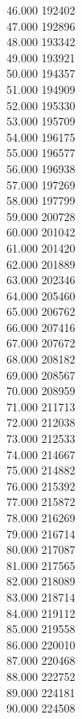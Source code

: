 { 46.000	192402 \\
 47.000	192896 \\
 48.000	193342 \\
 49.000	193921 \\
 50.000	194357 \\
 51.000	194909 \\
 52.000	195330 \\
 53.000	195709 \\
 54.000	196175 \\
 55.000	196577 \\
 56.000	196938 \\
 57.000	197269 \\
 58.000	197799 \\
 59.000	200728 \\
 60.000	201042 \\
 61.000	201420 \\
 62.000	201889 \\
 63.000	202346 \\
 64.000	205460 \\
 65.000	206762 \\
 66.000	207416 \\
 67.000	207672 \\
 68.000	208182 \\
 69.000	208567 \\
 70.000	208959 \\
 71.000	211713 \\
 72.000	212038 \\
 73.000	212533 \\
 74.000	214667 \\
 75.000	214882 \\
 76.000	215392 \\
 77.000	215872 \\
 78.000	216269 \\
 79.000	216714 \\
 80.000	217087 \\
 81.000	217565 \\
 82.000	218089 \\
 83.000	218714 \\
 84.000	219112 \\
 85.000	219558 \\
 86.000	220010 \\
 87.000	220468 \\
 88.000	222752 \\
 89.000	224181 \\
 90.000	224508 \\
}
